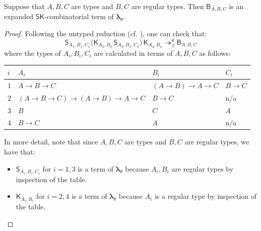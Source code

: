 \documentclass{lmcs} %
\newcommand{\param}{\theta}
\newcommand{\mltup}{\boldsymbol\lambda_{\param}}
\newcommand{\transreduces}[2]{\twoheadrightarrow_{#1}^{#2}}
\newcommand{\ctK}[4]{{\mathsf K}_{#1, #2}#3#4}
\newcommand{\ctS}[6]{{\mathsf S}_{#1, #2, #3}#4#5#6}
\newcommand{\ctB}[6]{{\mathsf B}_{#1, #2, #3}#4#5#6}
\begin{document}
\begin{prop}\label{prop:recoverblubirdinsk}
Suppose that $A,B,C$ are types and $B,C$ are regular types. Then $\ctB{A}{B}{C}{}{}{}$ is 
an expanded $\mathsf{SK}$-combinatorial term of $\mltup$.
\end{prop}
\begin{proof}
Following the untyped reduction (cf. \cite[158]{Curry1958-yi}), one can check that:
\begin{equation}\label{eqn:recoverblubirdinsk}
\ctS{A_1}{B_1}{C_1}{}{}{} \big(\ctK{A_2}{B_2}{}{} \, \ctS{A_3}{B_3}{C_3}{}{}{}  \big) \, \ctK{A_4}{B_4}{}{} \transreduces{\beta}{\param} \ctB{A}{B}{C}{}{}{}
\end{equation}
where the types of $A_i, B_i, C_i$ are calculated in terms of $A,B,C$ as follows:\\[5pt]
\begin{minipage}[b][5\baselineskip][t]{0.95\textwidth}
\centering
\begin{tabular}{|l|l|l|l|}
\hline
$i$ & $A_i$ & $B_i$ & $C_i$  \\ \hline
 $1$ & $A\rightarrow B\rightarrow C$ & $(A\rightarrow B)\rightarrow A\rightarrow C$ & $B\rightarrow C$  \\ \hline
 $2$ & $(A\rightarrow B\rightarrow C)\rightarrow (A\rightarrow B)\rightarrow A\rightarrow C$ & $B\rightarrow C$ &  n/a  \\ \hline 
 $3$ & $B$ & $C$ & $A$  \\ \hline
 $4$ & $B\rightarrow C$ & $A$ & n/a  \\ \hline
\end{tabular}
\end{minipage}
\qedhere

\begin{proofdetail}
In more detail, note that since $A,B,C$ are types and $B,C$ are regular types, we have that:
\begin{itemize}[leftmargin=*]
    \item $\ctS{A_i}{B_i}{C_i}{}{}{}$ for $i=1,3$ is a term of $\mltup$ because $A_i,B_i$ are regular types by inspection of the table.
    \item $\ctK{A_i}{B_i}{}{}$ for $i=2,4$ is a term of $\mltup$ because $A_i$ is a regular type by inspection of the table.
\end{itemize}


\end{proofdetail}
\end{proof}
\end{document}

